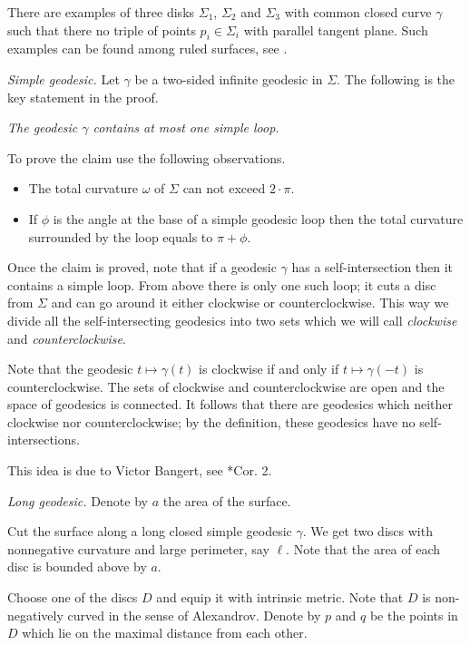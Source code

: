 There are examples of three disks $\Sigma_1$, $\Sigma_2$ and $\Sigma_3$
with common closed curve $\gamma$ such that there no triple of points $p_i\in\Sigma_i$ with parallel tangent plane.
Such examples can be found among ruled surfaces, see \cite{three-discs}.



\textit{Simple geodesic.}
Let $\gamma$ be a two-sided infinite geodesic in $\Sigma$.
The following is the key statement in the proof.

{\it The geodesic $\gamma$ contains at most one simple loop.}
\medskip

To prove the claim use the following observations.
\begin{itemize}
\item The total curvature $\omega$ of $\Sigma$ can not exceed $2\cdot\pi$.
\item If $\phi$ is the angle at the base of a simple geodesic loop then the total curvature surrounded by the loop equals to $\pi+\phi$.
\end{itemize}

Once the claim is proved, note that if a geodesic $\gamma$ has a self-intersection
then it contains a simple loop.
From above there is only one such loop;
it cuts a disc from $\Sigma$ 
and can go around it either clockwise or counterclockwise.
This way we divide all the self-intersecting geodesics 
into two sets which we will call \emph{clockwise} and \emph{counterclockwise}.

Note that the geodesic $t\mapsto \gamma(t)$ is clockwise 
if and only if 
$t\mapsto \gamma(-t)$
is counterclockwise.
The sets of clockwise and counterclockwise are open and the space of geodesics is connected. 
It follows that there are geodesics which neither clockwise nor counterclockwise;
by the definition, these geodesics have no self-intersections.

This idea is due to 
Victor Bangert, 
see \cite{bangert}*{Cor. 2}.

\textit{Long geodesic.}
Denote by $a$ the area of the surface.

Cut the surface along a long closed simple geodesic $\gamma$.
We get two discs with nonnegative curvature and large perimeter, 
say $\ell$.
Note that the area of each disc is bounded above by $a$.

Choose one of the discs $D$ and equip it with intrinsic metric.
Note that $D$ is non-negatively curved in the sense of Alexandrov.
Denote by $p$ and $q$ be the points in $D$ which lie on the maximal distance from each other.

